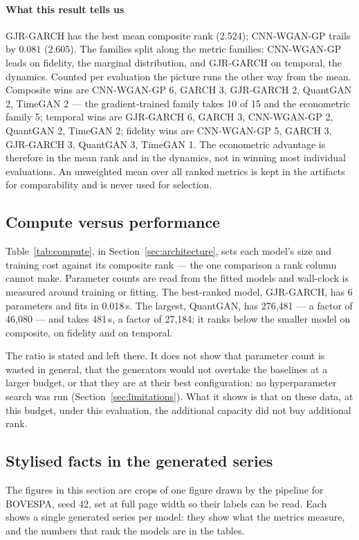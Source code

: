 \documentclass[11pt,a4paper]{article}
\makeatletter
\DeclareRobustCommand{\_}{\ifmmode\nfss@text{\textunderscore}\else\textunderscore\allowbreak\fi}
\makeatother
\begin{document}
\paragraph{What this result tells us} GJR-GARCH has the best mean composite rank (2.524); CNN-WGAN-GP trails by 0.081 (2.605). The families split along the metric families: CNN-WGAN-GP leads on fidelity, the marginal distribution, and GJR-GARCH on temporal, the dynamics. Counted per evaluation the picture runs the other way from the mean. Composite wins are CNN-WGAN-GP 6, GARCH 3, GJR-GARCH 2, QuantGAN 2, TimeGAN 2 --- the gradient-trained family takes 10 of 15 and the econometric family 5; temporal wins are GJR-GARCH 6, GARCH 3, CNN-WGAN-GP 2, QuantGAN 2, TimeGAN 2; fidelity wins are CNN-WGAN-GP 5, GARCH 3, GJR-GARCH 3, QuantGAN 3, TimeGAN 1. The econometric advantage is therefore in the mean rank and in the dynamics, not in winning most individual evaluations. An unweighted mean over all ranked metrics is kept in the artifacts for comparability and is never used for selection.

\subsection{Compute versus performance}
\label{sec:compute}
Table~\ref{tab:compute}, in Section~\ref{sec:architecture}, sets each model's size and training cost against its composite rank --- the one comparison a rank column cannot make. Parameter counts are read from the fitted models and wall-clock is measured around training or fitting. The best-ranked model, GJR-GARCH, has 6 parameters and fits in 0.018\,s. The largest, QuantGAN, has 276,481 --- a factor of 46,080 --- and takes 481\,s, a factor of 27,184; it ranks below the smaller model on composite, on fidelity and on temporal.

The ratio is stated and left there. It does not show that parameter count is wasted in general, that the generators would not overtake the baselines at a larger budget, or that they are at their best configuration: no hyperparameter search was run (Section~\ref{sec:limitations}). What it shows is that on these data, at this budget, under this evaluation, the additional capacity did not buy additional rank.

\subsection{Stylised facts in the generated series}
\label{sec:stylised}
The figures in this section are crops of one figure drawn by the pipeline for BOVESPA, seed 42, set at full page width so their labels can be read. Each shows a single generated series per model: they show what the metrics measure, and the numbers that rank the models are in the tables.
\end{document}
